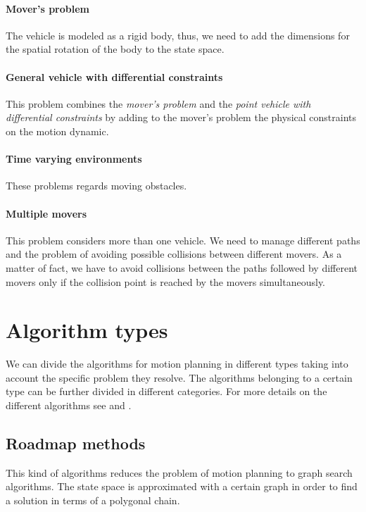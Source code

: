 \documentclass[dissertation.tex]{subfiles}
\begin{document}
\paragraph{Mover's problem}
The vehicle is modeled as a rigid body, thus, we need to add the
dimensions for the spatial rotation of the body to the state
space.

\paragraph{General vehicle with differential constraints}
This problem combines the \emph{mover's problem} and the \emph{point
  vehicle with 
differential constraints} by adding to the mover's
problem the physical constraints on the motion dynamic.

\paragraph{Time varying environments}
These problems regards moving obstacles.

\paragraph{Multiple movers}
This problem considers more than one vehicle. We need
to manage
different paths and the problem of avoiding possible
collisions between different movers. As a matter of fact, we have to
avoid
collisions between the paths followed by different movers only if
the collision point is reached by the movers simultaneously.

\section{Algorithm types}
We can divide the algorithms for motion planning in different types
taking into account the specific problem they resolve. The algorithms
belonging to a certain type can be further divided
in different categories.
For more details on the different algorithms see \cite{goerzen} and
\cite{choset}.

\subsection{Roadmap methods}
This kind of algorithms reduces the problem of motion planning to
graph search algorithms. The state space is approximated with a
certain graph in order to find a solution in terms of a polygonal
chain.
\end{document}
